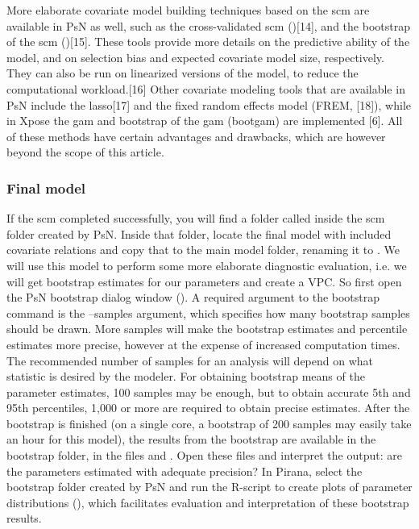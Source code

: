 More elaborate covariate model building techniques based on the scm
are available in PsN as well, such as the cross-validated scm
()[14], and the bootstrap of the scm ()[15]. These tools
provide more details on the predictive ability of the model, and on
selection bias and expected covariate model size, respectively. They
can also be run on linearized versions of the model, to reduce the
computational workload.[16] Other covariate modeling tools that are
available in PsN include the lasso[17] and the fixed random effects
model (FREM, [18]), while in Xpose the gam and bootstrap of the gam
(bootgam) are implemented [6]. All of these methods have certain
advantages and drawbacks, which are however beyond the scope of this
article.

\subsubsection{Final model}
If the scm completed successfully, you will find a folder called
 inside the scm folder created by PsN. Inside that folder,
locate the final model with included covariate relations and copy that
to the main model folder, renaming it to . We will use this
model to perform some more elaborate diagnostic evaluation, i.e. we
will get bootstrap estimates for our parameters and create a VPC. So
first open the PsN bootstrap dialog window (). A
required argument to the bootstrap command is the –samples argument,
which specifies how many bootstrap samples should be drawn. More
samples will make the bootstrap estimates and percentile estimates
more precise, however at the expense of increased computation
times. The recommended number of samples for an analysis will depend
on what statistic is desired by the modeler. For obtaining bootstrap
means of the parameter estimates, 100 samples may be enough, but to
obtain accurate 5th and 95th percentiles, 1,000 or more are required
to obtain precise estimates. After the bootstrap is finished (on a
single core, a bootstrap of 200 samples may easily take an hour for
this model), the results from the bootstrap are available in the
bootstrap folder, in the files  and
. Open these files and interpret the output: are
the parameters estimated with adequate precision? In Pirana, select
the bootstrap folder created by PsN and run the R-script to create
plots of parameter distributions (), which facilitates evaluation and
interpretation of these bootstrap results. 

